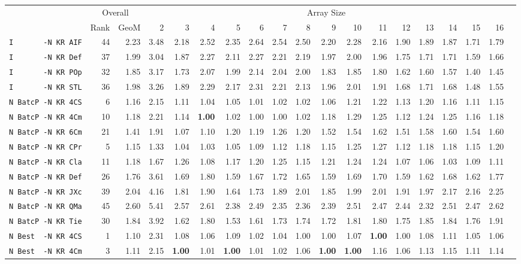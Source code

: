 \begin{tabular}{l | r @{~~} r | r@{~~}r@{~~}r@{~~}r@{~~}r@{~~}r@{~~}r@{~~}r@{~~}r@{~~}r@{~~}r@{~~}r@{~~}r@{~~}r@{~~}r@{~~}r|}
 & \multicolumn{2}{c}{Overall} & \multicolumn{15}{c}{Array Size} \\
 & Rank & GeoM & 2&3&4&5&6&7&8&9&10&11&12&13&14&15&16\\ \hline
\verb+I       -N KR AIF+ & 44 & 2.23 & 3.48&2.18&2.52&2.35&2.64&2.54&2.50&2.20&2.28&2.16&1.90&1.89&1.87&1.71&1.79\\
\verb+I       -N KR Def+ & 37 & 1.99 & 3.04&1.87&2.27&2.11&2.27&2.21&2.19&1.97&2.00&1.96&1.75&1.71&1.71&1.59&1.66\\
\verb+I       -N KR POp+ & 32 & 1.85 & 3.17&1.73&2.07&1.99&2.14&2.04&2.00&1.83&1.85&1.80&1.62&1.60&1.57&1.40&1.45\\
\verb+I       -N KR STL+ & 36 & 1.98 & 3.26&1.89&2.29&2.17&2.31&2.21&2.13&1.96&2.01&1.91&1.68&1.71&1.68&1.48&1.55\\
\verb+N BatcP -N KR 4CS+ & 6 & 1.16 & 2.15&1.11&1.04&1.05&1.01&1.02&1.02&1.06&1.21&1.22&1.13&1.20&1.16&1.11&1.15\\
\verb+N BatcP -N KR 4Cm+ & 10 & 1.18 & 2.21&1.14&\textbf{1.00}&1.02&1.00&1.00&1.02&1.18&1.29&1.25&1.12&1.24&1.25&1.16&1.18\\
\verb+N BatcP -N KR 6Cm+ & 21 & 1.41 & 1.91&1.07&1.10&1.20&1.19&1.26&1.20&1.52&1.54&1.62&1.51&1.58&1.60&1.54&1.60\\
\verb+N BatcP -N KR CPr+ & 5 & 1.15 & 1.33&1.04&1.03&1.05&1.09&1.12&1.18&1.15&1.25&1.27&1.12&1.18&1.18&1.15&1.20\\
\verb+N BatcP -N KR Cla+ & 11 & 1.18 & 1.67&1.26&1.08&1.17&1.20&1.25&1.15&1.21&1.24&1.24&1.07&1.06&1.03&1.09&1.11\\
\verb+N BatcP -N KR Def+ & 26 & 1.76 & 3.61&1.69&1.80&1.59&1.67&1.72&1.65&1.59&1.69&1.70&1.59&1.62&1.68&1.62&1.77\\
\verb+N BatcP -N KR JXc+ & 39 & 2.04 & 4.16&1.81&1.90&1.64&1.73&1.89&2.01&1.85&1.99&2.01&1.91&1.97&2.17&2.16&2.25\\
\verb+N BatcP -N KR QMa+ & 45 & 2.60 & 5.41&2.57&2.61&2.38&2.49&2.35&2.36&2.39&2.51&2.47&2.44&2.32&2.51&2.47&2.62\\
\verb+N BatcP -N KR Tie+ & 30 & 1.84 & 3.92&1.62&1.80&1.53&1.61&1.73&1.74&1.72&1.81&1.80&1.75&1.85&1.84&1.76&1.91\\
\verb+N Best  -N KR 4CS+ & 1 & 1.10 & 2.31&1.08&1.06&1.09&1.02&1.04&1.00&1.00&1.07&\textbf{1.00}&1.00&1.08&1.11&1.05&1.06\\
\verb+N Best  -N KR 4Cm+ & 3 & 1.11 & 2.15&\textbf{1.00}&1.01&\textbf{1.00}&1.01&1.02&1.06&\textbf{1.00}&\textbf{1.00}&1.16&1.06&1.13&1.15&1.11&1.14\\

\end{tabular}
